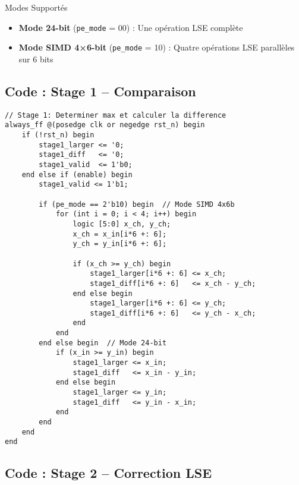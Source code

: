 \documentclass[12pt,a4paper]{article}
\newcommand{\signal}[1]{\texttt{#1}}
\begin{document}
\begin{notebox}{Modes Supportés}
\begin{itemize}
    \item \textbf{Mode 24-bit} (\signal{pe\_mode} = 00) : Une opération LSE complète
    \item \textbf{Mode SIMD 4×6-bit} (\signal{pe\_mode} = 10) : Quatre opérations LSE parallèles sur 6 bits
\end{itemize}
\end{notebox}

\subsection{Code : Stage 1 -- Comparaison}

\begin{lstlisting}[style=verilog, caption={Stage 1 : Calcul du maximum et de la différence}]
// Stage 1: Determiner max et calculer la difference
always_ff @(posedge clk or negedge rst_n) begin
    if (!rst_n) begin
        stage1_larger <= '0;
        stage1_diff   <= '0;
        stage1_valid  <= 1'b0;
    end else if (enable) begin
        stage1_valid <= 1'b1;
        
        if (pe_mode == 2'b10) begin  // Mode SIMD 4x6b
            for (int i = 0; i < 4; i++) begin
                logic [5:0] x_ch, y_ch;
                x_ch = x_in[i*6 +: 6];
                y_ch = y_in[i*6 +: 6];
                
                if (x_ch >= y_ch) begin
                    stage1_larger[i*6 +: 6] <= x_ch;
                    stage1_diff[i*6 +: 6]   <= x_ch - y_ch;
                end else begin
                    stage1_larger[i*6 +: 6] <= y_ch;
                    stage1_diff[i*6 +: 6]   <= y_ch - x_ch;
                end
            end
        end else begin  // Mode 24-bit
            if (x_in >= y_in) begin
                stage1_larger <= x_in;
                stage1_diff   <= x_in - y_in;
            end else begin
                stage1_larger <= y_in;
                stage1_diff   <= y_in - x_in;
            end
        end
    end
end
\end{lstlisting}

\subsection{Code : Stage 2 -- Correction LSE}
\end{document}
